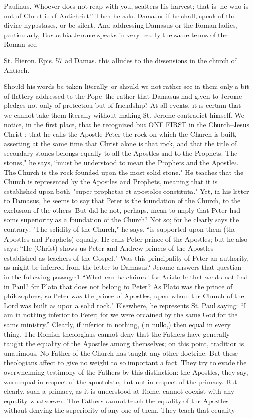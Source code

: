 Paulinus. Whoever does not reap with you, scatters his harvest; that is, he who is not of Christ is of Antichrist.'' Then he asks Damasus if he shall, speak of the divine hypostases, or be silent. And addressing Damasus or the Roman ladies, particularly, Eustochia Jerome speaks in very nearly the same terms of the Roman see.

St. Hieron. Epis. 57 ad Damas. this alludes to the dissensions in the church of Antioch.

Should his words be taken literally, or should we not rather see in them only a bit of flattery addressed to the Pope--the rather that Damasus had given to Jerome pledges not only of protection but of friendship? At all events, it is certain that we cannot take them literally without making St. Jerome contradict himself. We notice, in the first place, that he recognized but ONE FIRST in the Church--Jesus Christ ; that he calls the Apostle Peter the rock on which the Church is built, asserting at the same time that Christ alone is that rock, and that the title of secondary stones belongs equally to all the Apostles and to the Prophets. The stones," he says, “must be understood to mean the Prophets and the Apostles. The Church is the rock founded upon the most solid stone." He teaches that the Church is represented by the Apostles and Prophets, meaning that it is established upon both--"super prophetas et apostolos constituta." Yet, in his letter to Damasus, he seems to say that Peter is the foundation of the Church, to the exclusion of the others. But did he not, perhaps, mean to imply that Peter had some superiority as a foundation of the Church? Not so; for he clearly says the contrary: "The solidity of the Church," he says, “is supported upon them (the Apostles and Prophets) equally. He calls Peter prince of the Apostles; but he also says: “He (Christ) shows us Peter and Andrew-princes of the Apostles--established as teachers of the Gospel." Was this principality of Peter an authority, as might be inferred from the letter to Damasus? Jerome answers that question in the following passage:1 “What can be claimed for Aristotle that we do not find in Paul? for Plato that does not belong to Peter? As Plato was the prince of philosophers, so Peter was the prince of Apostles, upon whom the Church of the Lord was built as upon a solid rock." Elsewhere, he represents St. Paul saying: “I am in nothing inferior to Peter; for we were ordained by the same God for the same ministry.” Clearly, if inferior in nothing, (in nullo,) then equal in every thing. The Romish theologians cannot deny that the Fathers have generally taught the equality of the Apostles among themselves; on this point, tradition is unauimous. No Father of the Church has taught any other doctrine. But these theologians affect to give no weight to so important a fact. They try to evade the overwhelming testimony of the Fathers by this distinction: the Apostles, they say, were equal in respect of the apostolate, but not in respect of the primacy. But clearly, such a primacy, as it is understood at Rome, cannot coexist with any equality whatsoever. The Fathers cannot teach the equality of the Apostles without denying the superiority of any one of them. They teach that equality 